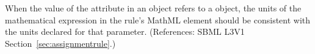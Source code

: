 When the value of the attribute  in an \AssignmentRule
object refers to a \Parameter object, the units of the mathematical
expression in the rule's MathML  element should be consistent
with the units declared for that parameter.  (References: SBML L3V1
Section~\ref{sec:assignmentrule}.)
